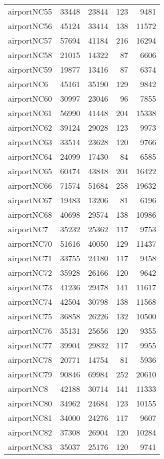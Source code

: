 \begin{tabular}{lrrrr}
airportNC55 & 33448 & 23844 & 123 & 9481 \\
airportNC56 & 45124 & 33414 & 138 & 11572 \\
airportNC57 & 57694 & 41184 & 216 & 16294 \\
airportNC58 & 21015 & 14322 & 87 & 6606 \\
airportNC59 & 19877 & 13416 & 87 & 6374 \\
airportNC6 & 45161 & 35190 & 129 & 9842 \\
airportNC60 & 30997 & 23046 & 96 & 7855 \\
airportNC61 & 56990 & 41448 & 204 & 15338 \\
airportNC62 & 39124 & 29028 & 123 & 9973 \\
airportNC63 & 33514 & 23628 & 120 & 9766 \\
airportNC64 & 24099 & 17430 & 84 & 6585 \\
airportNC65 & 60474 & 43848 & 204 & 16422 \\
airportNC66 & 71574 & 51684 & 258 & 19632 \\
airportNC67 & 19483 & 13206 & 81 & 6196 \\
airportNC68 & 40698 & 29574 & 138 & 10986 \\
airportNC7 & 35232 & 25362 & 117 & 9753 \\
airportNC70 & 51616 & 40050 & 129 & 11437 \\
airportNC71 & 33755 & 24180 & 117 & 9458 \\
airportNC72 & 35928 & 26166 & 120 & 9642 \\
airportNC73 & 41236 & 29478 & 141 & 11617 \\
airportNC74 & 42504 & 30798 & 138 & 11568 \\
airportNC75 & 36858 & 26226 & 132 & 10500 \\
airportNC76 & 35131 & 25656 & 120 & 9355 \\
airportNC77 & 39904 & 29832 & 117 & 9955 \\
airportNC78 & 20771 & 14754 & 81 & 5936 \\
airportNC79 & 90846 & 69984 & 252 & 20610 \\
airportNC8 & 42188 & 30714 & 141 & 11333 \\
airportNC80 & 34962 & 24684 & 123 & 10155 \\
airportNC81 & 34000 & 24276 & 117 & 9607 \\
airportNC82 & 37308 & 26904 & 120 & 10284 \\
airportNC83 & 35037 & 25176 & 120 & 9741 \\

\end{tabular}

